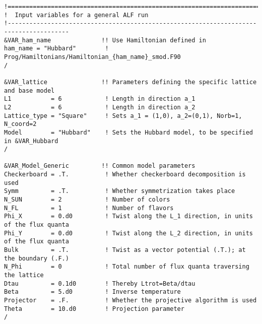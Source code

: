 \begin{lstlisting}[style=fortran,escapechar=\#,breaklines=true]
!=======================================================================================
!  Input variables for a general ALF run
!---------------------------------------------------------------------------------------
&VAR_ham_name              !! Use Hamiltonian defined in
ham_name = "Hubbard"        ! Prog/Hamiltonians/Hamiltonian_{ham_name}_smod.F90
/

&VAR_lattice               !! Parameters defining the specific lattice and base model
L1           = 6            ! Length in direction a_1
L2           = 6            ! Length in direction a_2
Lattice_type = "Square"     ! Sets a_1 = (1,0), a_2=(0,1), Norb=1, N_coord=2
Model        = "Hubbard"    ! Sets the Hubbard model, to be specified in &VAR_Hubbard
/

&VAR_Model_Generic         !! Common model parameters
Checkerboard = .T.          ! Whether checkerboard decomposition is used
Symm         = .T.          ! Whether symmetrization takes place
N_SUN        = 2            ! Number of colors
N_FL         = 1            ! Number of flavors
Phi_X        = 0.d0         ! Twist along the L_1 direction, in units of the flux quanta
Phi_Y        = 0.d0         ! Twist along the L_2 direction, in units of the flux quanta
Bulk         = .T.          ! Twist as a vector potential (.T.); at the boundary (.F.)
N_Phi        = 0            ! Total number of flux quanta traversing the lattice
Dtau         = 0.1d0        ! Thereby Ltrot=Beta/dtau
Beta         = 5.d0         ! Inverse temperature
Projector    = .F.          ! Whether the projective algorithm is used
Theta        = 10.d0        ! Projection parameter
/


\end{lstlisting}
